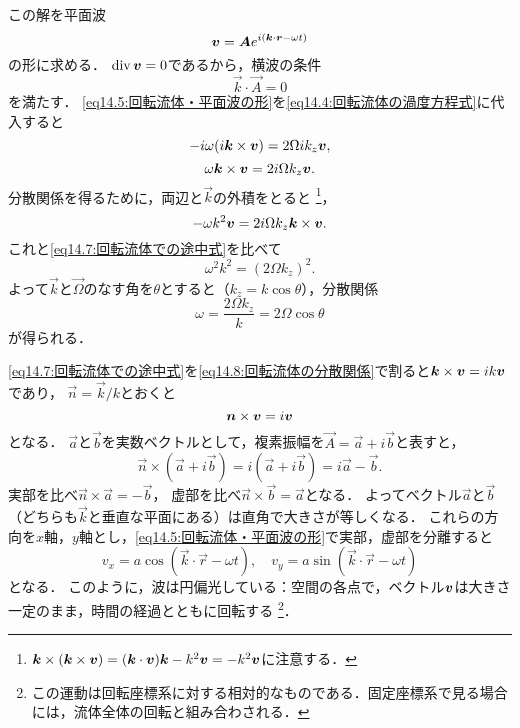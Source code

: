 この解を平面波 
\begin{equation}\label{eq14.5:回転流体・平面波の形}
    \vb*{v} = \vb*{A} e^{i(\vb*{k}\cdot\vb*{r}-\omega t)}
\end{equation}
の形に求める．
$\operatorname{div}\vb*{v}=0$であるから，横波の条件
\begin{equation}
    \vec{k} \cdot \vec{A} = 0
\end{equation}
を満たす．
\eqref{eq14.5:回転流体・平面波の形}を\eqref{eq14.4:回転流体の渦度方程式}に代入すると
\[
    -i\omega(i\vb*{k}\times\vb*{v}) = 2\Omega ik_z \vb*{v} ,
\]
\begin{equation}\label{eq14.7:回転流体での途中式}
    \omega \vb*{k}\times\vb*{v} = 2i\Omega k_z \vb*{v}.
\end{equation}
分散関係を得るために，両辺と$\vec{k}$の外積をとると
\footnote{
$\vb*{k}\times(\vb*{k}\times\vb*{v}) = (\vb*{k}\cdot\vb*{v})\vb*{k} -k^2\vb*{v} = -k^2\vb*{v}$に注意する．
}，
\[
    -\omega k^2 \vb*{v} = 2i\Omega k_z \vb*{k}\times\vb*{v} .
\]
これと\eqref{eq14.7:回転流体での途中式}を比べて
\[
    \omega^2 k^2 = (2\Omega k_z)^2 .
\]
よって$\vec{k}$と$\vec{\Omega}$のなす角を$\theta$とすると（$k_z=k\cos\theta$），分散関係
\begin{equation}\label{eq14.8:回転流体の分散関係}
    \omega = \frac{2\Omega k_z}{k} = 2\Omega \cos\theta 
\end{equation}
が得られる．


\eqref{eq14.7:回転流体での途中式}を\eqref{eq14.8:回転流体の分散関係}で割ると$\vb*{k}\times\vb*{v} = ik\vb*{v}$であり，
$\vec{n}= \vec{k}/k$とおくと
\[
    \vb*{n}\times\vb*{v} = i\vb*{v}
\]
となる．
$\vec{a}$と$\vec{b}$を実数ベクトルとして，複素振幅を$\vec{A} = \vec{a}+i\vec{b}$と表すと，
\[
    \vec{n} \times (\vec{a}+i\vec{b}) = i (\vec{a}+i\vec{b}) = i\vec{a} - \vec{b} .
\]
実部を比べ$\vec{n}\times\vec{a}=-\vec{b}$，
虚部を比べ$\vec{n}\times\vec{b}=\vec{a}$となる．
よってベクトル$\vec{a}$と$\vec{b}$（どちらも$\vec{k}$と垂直な平面にある）は直角で大きさが等しくなる．
これらの方向を$x$軸，$y$軸とし，\eqref{eq14.5:回転流体・平面波の形}で実部，虚部を分離すると
\[
    v_x = a \cos(\vec{k}\cdot\vec{r}-\omega t), \quad
    v_y = a \sin(\vec{k}\cdot\vec{r}-\omega t)
\]
となる．
このように，波は円偏光している：空間の各点で，ベクトル$\vb*{v}$は大きさ一定のまま，時間の経過とともに回転する
\footnote{この運動は回転座標系に対する相対的なものである．固定座標系で見る場合には，流体全体の回転と組み合わされる．}．


